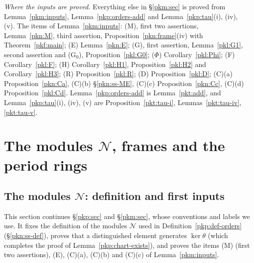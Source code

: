 \documentclass[10pt]{amsart}
\theoremstyle{definition}
\theoremstyle{remark}
\newcommand{\Q}{\mathbb Q}
\begin{document}
\emph{Where the inputs are proved.} Everything else in \S\ref{pkm:sec} is proved from
Lemma~\ref{pkm:inputs}, Lemma~\ref{pkp:orders-add} and Lemma~\ref{pkp:tau}(i), (iv), (v). The items of
Lemma~\ref{pkm:inputs}: (M), first two assertions, Lemma~\ref{pkn:M}, third assertion,
Proposition~\ref{pkn:frame}(iv) with Theorem~\ref{pkf:main}; (E) Lemma~\ref{pkn:E}; (G), first assertion,
Lemma~\ref{pkl:G1}, second assertion and (G$_0$), Proposition~\ref{pkl:G0}; ($\Phi$)
Corollary~\ref{pkl:Phi}; (F) Corollary~\ref{pkl:F}; (H) Corollary~\ref{pkl:H1}, Proposition~\ref{pkl:H2}
and Corollary~\ref{pkl:H3}; (R) Proposition~\ref{pkl:R}; (D) Proposition~\ref{pkl:D}; (C)(a)
Proposition~\ref{pkn:Ca}, (C)(b) \S\ref{pkn:ss-ME}, (C)(c) Proposition~\ref{pkn:Cc}, (C)(d)
Proposition~\ref{pkl:Cd}. Lemma~\ref{pkp:orders-add} is Lemma~\ref{pkt:add}, and
Lemma~\ref{pkp:tau}(i), (iv), (v) are Proposition~\ref{pkt:tau-i}, Lemmas~\ref{pkt:tau-iv},
\ref{pkt:tau-v}.



\section{The modules $\mathcal N$, frames and the period rings}\label{C4:g3}
\providecommand{\auO}{\mathcal O}
\providecommand{\auQlb}{\overline{\Q}_\ell}
\providecommand{\panot}[1]{\par\smallskip{\raggedright\noindent\textbf{[Not proved here:} #1\textbf{]}\par}\smallskip}
\providecommand{\pkpA}{A_{\mathrm{inf}}}
\providecommand{\pkpW}{W(C^\flat)}
\providecommand{\pkpm}{W(\mathfrak m^\flat)}
\providecommand{\pkpAmb}{\mathbb A}
\providecommand{\pknMinf}{\mathfrak M_{\mathrm{inf}}}
\providecommand{\pknK}{\mathcal K_0}
\providecommand{\pknBp}{B^+_{\mathrm{dR}}}
\providecommand{\pknB}{B_{\mathrm{dR}}}

\subsection{The modules $\mathcal N$: definition and first inputs}\label{pkn:sec}

This section continues \S\ref{pkp:sec} and \S\ref{pkm:sec}, whose conventions and labels we use. It
fixes the definition of the modules $\mathcal N$ used in Definition~\ref{pkp:def-orders}
(\S\ref{pkn:ss-def}), proves that a distinguished element
generates $\ker\theta$ (which completes the proof of Lemma~\ref{pkp:chart-exists}), and proves the
items (M) (first two assertions), (E), (C)(a), (C)(b) and (C)(c) of Lemma~\ref{pkm:inputs}.
\end{document}
